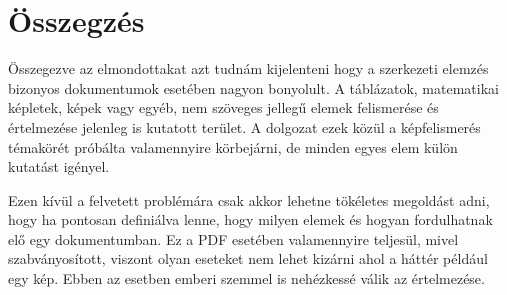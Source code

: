 \documentclass{article}
\begin{document}
\section{Összegzés}

Összegezve az elmondottakat azt tudnám kijelenteni hogy a szerkezeti elemzés bizonyos dokumentumok esetében nagyon bonyolult. A táblázatok, matematikai képletek, képek vagy egyéb, nem szöveges jellegű elemek felismerése és értelmezése jelenleg is kutatott terület. A dolgozat ezek közül a képfelismerés témakörét próbálta valamennyire körbejárni, de minden egyes elem külön kutatást igényel.

 Ezen kívül a felvetett problémára csak akkor lehetne tökéletes megoldást adni, hogy ha pontosan definiálva lenne, hogy milyen elemek és hogyan fordulhatnak elő egy dokumentumban. Ez a PDF esetében valamennyire teljesül, mivel szabványosított, viszont olyan eseteket nem lehet kizárni ahol a háttér például egy kép. Ebben az esetben emberi szemmel is nehézkessé válik az értelmezése.
\end{document}
